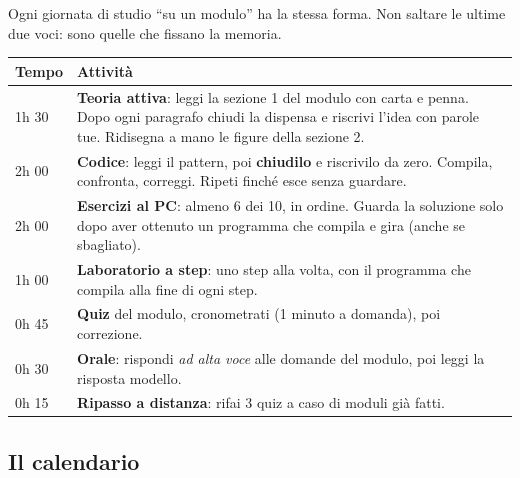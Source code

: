Ogni giornata di studio ``su un modulo'' ha la stessa forma. Non saltare le ultime due
voci: sono quelle che fissano la memoria.
\begin{center}
\begin{tabular}{lp{10.5cm}}
\toprule
\textbf{Tempo} & \textbf{Attività} \\
\midrule
1h 30 & \textbf{Teoria attiva}: leggi la sezione 1 del modulo con carta e penna. Dopo ogni
        paragrafo chiudi la dispensa e riscrivi l'idea con parole tue. Ridisegna a mano le
        figure della sezione 2. \\
2h 00 & \textbf{Codice}: leggi il pattern, poi \textbf{chiudilo} e riscrivilo da zero.
        Compila, confronta, correggi. Ripeti finché esce senza guardare. \\
2h 00 & \textbf{Esercizi al PC}: almeno 6 dei 10, in ordine. Guarda la soluzione solo
        dopo aver ottenuto un programma che compila e gira (anche se sbagliato). \\
1h 00 & \textbf{Laboratorio a step}: uno step alla volta, con il programma che compila
        alla fine di ogni step. \\
0h 45 & \textbf{Quiz} del modulo, cronometrati (1 minuto a domanda), poi correzione. \\
0h 30 & \textbf{Orale}: rispondi \emph{ad alta voce} alle domande del modulo, poi leggi
        la risposta modello. \\
0h 15 & \textbf{Ripasso a distanza}: rifai 3 quiz a caso di moduli già fatti. \\
\bottomrule
\end{tabular}
\end{center}

\subsection*{Il calendario}

